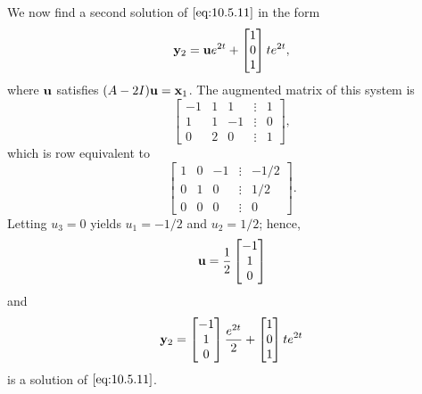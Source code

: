 \documentclass{ximera}
\begin{document}
\begin{example}
\begin{explanation}
We  now find a second solution of  $\eqref{eq:10.5.11}$  in the form
$$
{\bf y}_2={\bf u}e^{2t}+\begin{bmatrix}1\\0\\1\end{bmatrix}te^{2t},
$$
where ${\bf u}$ satisfies $(A-2I){\bf u=x}_1$.
The  augmented matrix  of this system is
$$
\begin{bmatrix} -1 & 1 & 1 &\vdots & 1\\
1& 1 & -1 &\vdots & 0\\ 0 & 2 & 0 &
\vdots & 1\end{bmatrix}, $$
which is row equivalent to
$$
\begin{bmatrix} 1 & 0 &- 1 &\vdots& -1/2\\ 0 & 1 & 0
&\vdots& 1/2\\ 0 & 0 & 0 &\vdots&0\end{bmatrix}.
$$
Letting $u_3=0$ yields $u_1=-1/2$ and $u_2=1/2$; hence,
$$
{\bf u}=\frac{1}{2}\begin{bmatrix}-1\\1\\0\end{bmatrix}
$$
and
$$
{\bf y}_2=\begin{bmatrix}-1\\1\\0\end{bmatrix}\frac{e^{2t}}{2}+\begin{bmatrix}1\\0\\1\end{bmatrix}te^{2t}
$$
is a solution of  $\eqref{eq:10.5.11}$.


\end{explanation}
\end{example}
\end{document}

